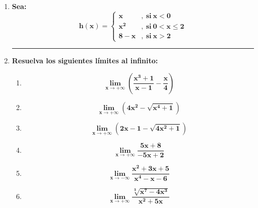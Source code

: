 \documentclass[12pt]{article}
\begin{document}
\begin{enumerate}[label=\textbf{\arabic*.}]
            \vspace{1cm}\hrule
            \item \textbf{Sea: }
                \[
                    \boldsymbol{
                        h(x) = 
                        \left\{
                            \begin{array}{ll}
                                x & ,\ \text{si} \ x < 0 \\
                                x ^2 & ,\ \text{si} \ 0 < x \leq 2 \\
                                8 - x & ,\ \text{si} \ x > 2
                            \end{array}
                        \right.
                    }
                \]
            
            
            \vspace{1cm}\hrule
            \item \textbf{Resuelva los siguientes límites al infinito:}
                \begin{enumerate}[label=\textbf{\arabic*)}] 
                    \item \[\bm{\lim_{x \to +\infty} \left( \frac{x^3 + 1}{x - 1} - \frac{x}{4} \right)}\]
                    \item \[\bm{\lim_{x \to +\infty} \left( 4x^2 - \sqrt{x^4 + 1} \right)}\]
                    \item \[\bm{\lim_{x \to +\infty} \left( 2x - 1 - \sqrt{4x^2 + 1} \right)}\]
                    \item \[\bm{\lim_{x \to +\infty} \frac{5x + 8}{-5x + 2}}\]
                    \item \[\bm{\lim_{x \to -\infty} \frac{x^2 + 3x + 5}{x^4 - x - 6}}\]
                    \item \[\bm{\lim_{x \to +\infty} \frac{\sqrt[3]{x^7 - 4x^3}}{x^2 + 5x}}\]
                \end{enumerate}

        
        \end{enumerate}
\end{document}
